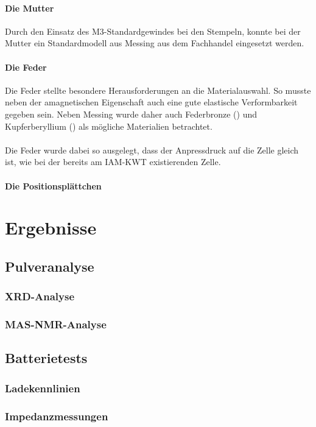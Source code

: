 \documentclass[a4paper, 11pt, headsepline,footsepline,twoside,abstract]{scrbook}
\begin{document}
\subsubsection{Die Mutter}
Durch den Einsatz des M3-Standardgewindes bei den Stempeln, konnte bei der Mutter ein Standardmodell aus Messing aus dem Fachhandel eingesetzt werden.
\subsubsection{Die Feder}
Die Feder stellte besondere Herausforderungen an die Materialauswahl. So musste neben der amagnetischen Eigenschaft auch eine gute elastische Verformbarkeit gegeben sein. Neben Messing wurde daher auch Federbronze () und Kupferberyllium () als mögliche Materialien betrachtet.
\\\\
Die Feder wurde dabei so ausgelegt, dass der Anpressdruck auf die Zelle gleich ist, wie bei der bereits am IAM-KWT existierenden Zelle.

\subsubsection{Die Positionsplättchen}
\chapter{Ergebnisse}
\section{Pulveranalyse}
\subsection{XRD-Analyse}
\subsection{MAS-NMR-Analyse}
\section{Batterietests}
\subsection{Ladekennlinien}
\subsection{Impedanzmessungen}
\end{document}
